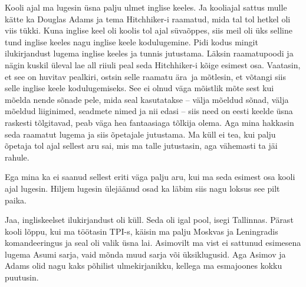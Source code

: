 Kooli ajal ma lugesin üsna palju ulmet inglise keeles. Ja kooliajal sattus mulle kätte ka Douglas Adams ja tema Hitchhiker-i raamatud, mida tal tol hetkel oli viis tükki. Kuna inglise keel oli koolis tol ajal süvaõppes, siis meil oli üks selline tund inglise keeles nagu inglise keele kodulugemine. Pidi kodus mingit ilukirjandust lugema inglise keeles ja tunnis  jutustama. Läksin raamatupoodi ja nägin kuskil üleval lae all riiuli peal seda Hitchhiker-i kõige esimest osa. Vaatasin, et see on huvitav pealkiri, ostsin selle raamatu ära ja mõtlesin, et võtangi siis selle inglise keele kodulugemiseks. See ei olnud väga mõistlik mõte sest kui mõelda nende sõnade pele, mida seal kasutatakse -- välja mõeldud sõnad, välja mõeldud liiginimed, seadmete nimed ja nii edasi -- siis need on eesti keelde üsna raskesti tõlgitavad,  peab väga hea fantaasiaga tõlkija olema. Aga mina hakkasin seda raamatut lugema ja siis õpetajale jutustama. Ma küll ei tea, kui palju õpetaja tol ajal sellest aru sai, mis ma talle jutustasin, aga vähemasti ta jäi rahule. 


Ega mina ka ei saanud  sellest eriti väga palju aru, kui ma seda esimest osa kooli ajal lugesin. Hiljem lugesin  ülejäänud osad ka läbim siis nagu loksus see pilt paika.


Jaa, ingliskeelset ilukirjandust oli küll. Seda oli igal pool, isegi Tallinnas. Pärast kooli lõppu, kui ma töötasin TPI-s, käisin ma palju Moskvas ja Leningradis komandeeringus ja seal oli valik üsna lai. Asimovilt ma vist ei sattunud esimesena lugema Asumi sarja, vaid mõnda muud sarja või üksiklugusid. Aga Asimov ja Adams olid nagu kaks põhilist ulmekirjanikku, kellega ma esmajoones kokku puutusin. 


